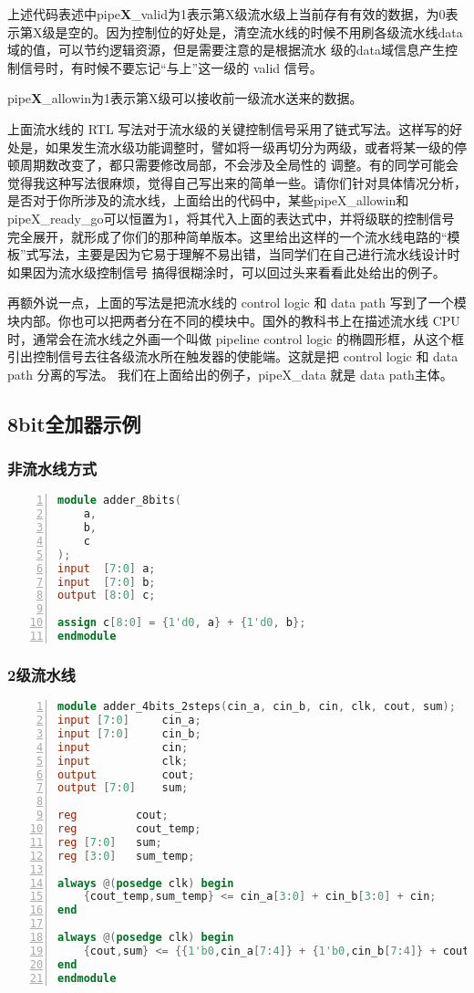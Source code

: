 上述代码表述中pipe\textbf{X}\_valid为1表示第X级流水级上当前存有有效的数据，为0表示第X级是空的。因为控制位的好处是，清空流水线的时候不用刷各级流水线data域的值，可以节约逻辑资源，但是需要注意的是根据流水 级的data域信息产生控制信号时，有时候不要忘记“与上”这一级的 valid 信号。

pipe\textbf{X}\_allowin为1表示第X级可以接收前一级流水送来的数据。

上面流水线的 RTL 写法对于流水级的关键控制信号采用了链式写法。这样写的好处是，如果发生流水级功能调整时，譬如将一级再切分为两级，或者将某一级的停顿周期数改变了，都只需要修改局部，不会涉及全局性的 调整。有的同学可能会觉得我这种写法很麻烦，觉得自己写出来的简单一些。请你们针对具体情况分析，是否对于你所涉及的流水线，上面给出的代码中，某些pipeX\_allowin和pipeX\_ready\_go可以恒置为1，将其代入上面的表达式中，并将级联的控制信号完全展开，就形成了你们的那种简单版本。这里给出这样的一个流水线电路的“模板”式写法，主要是因为它易于理解不易出错，当同学们在自己进行流水线设计时如果因为流水级控制信号 搞得很糊涂时，可以回过头来看看此处给出的例子。

再额外说一点，上面的写法是把流水线的 control logic 和 data path 写到了一个模块内部。你也可以把两者分在不同的模块中。国外的教科书上在描述流水线 CPU 时，通常会在流水线之外画一个叫做 pipeline control logic 的椭圆形框，从这个框引出控制信号去往各级流水所在触发器的使能端。这就是把 control logic 和 data path 分离的写法。 我们在上面给出的例子，pipeX\_data 就是 data path主体。
 
\subsection{8bit全加器示例}
\subsubsection{非流水线方式}
\begin{lstlisting}[language=Verilog,label=lst:no_stage,caption=8bit全加器非流水线实现,numbers=left,xleftmargin=5em,xrightmargin=5em, aboveskip=2em]
module adder_8bits(
    a, 
    b, 
    c
);
input  [7:0] a;
input  [7:0] b;
output [8:0] c;

assign c[8:0] = {1'd0, a} + {1'd0, b};
endmodule
\end{lstlisting}
\subsubsection{2级流水线}
\begin{lstlisting}[language=Verilog,label=lst:2_stage_pipeline,caption=8bit全加器2级流水线实现,numbers=left,xleftmargin=5em,xrightmargin=5em, aboveskip=2em]
module adder_4bits_2steps(cin_a, cin_b, cin, clk, cout, sum);
input [7:0]     cin_a;
input [7:0]     cin_b;
input           cin;
input           clk;
output          cout;
output [7:0]    sum;
	 
reg         cout;
reg         cout_temp;
reg [7:0]   sum;
reg [3:0]   sum_temp;
	 
always @(posedge clk) begin
    {cout_temp,sum_temp} <= cin_a[3:0] + cin_b[3:0] + cin;
end
	 
always @(posedge clk) begin
    {cout,sum} <= {{1'b0,cin_a[7:4]} + {1'b0,cin_b[7:4]} + cout_temp, sum_temp};
end
endmodule
\end{lstlisting}
